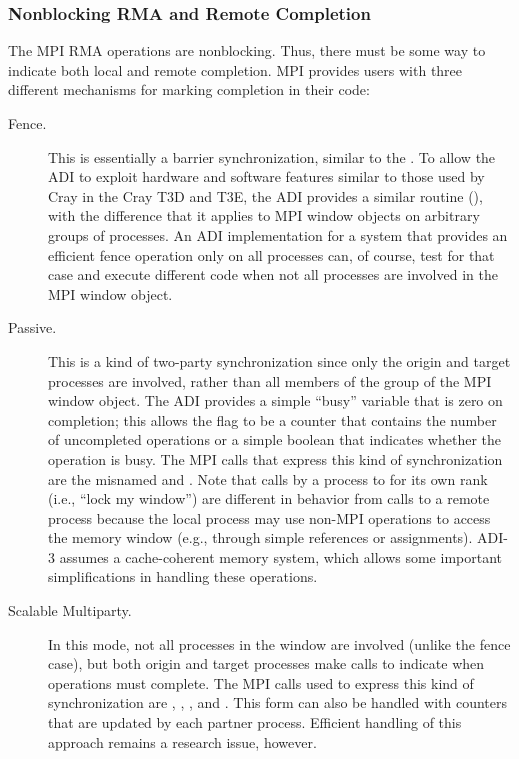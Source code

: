 \subsubsection{Nonblocking RMA and Remote Completion}
The MPI RMA operations are nonblocking.  Thus, there must be some way
to indicate both local and remote completion.  MPI provides users
with three different mechanisms for marking completion in their code:
\begin{description}
\item[Fence.]This is essentially a barrier synchronization, similar to
the .  To allow the ADI to exploit hardware and
software features similar to those used by Cray  in the
Cray T3D and T3E, the ADI provides a similar routine
(), with the 
difference that it applies to MPI window objects on arbitrary groups
of processes. An ADI implementation for a system that
provides an efficient fence operation only on all processes can, of
course, test for that case and execute different code when not all
processes are involved in the MPI window object.

\item[Passive.]This is a kind of two-party synchronization since only
the origin and target processes are involved, rather than all members of the
group of the MPI window object.  The ADI provides a
simple ``busy'' variable that is zero on completion; this allows the
flag to be a counter that contains the number of uncompleted
operations or a simple boolean that indicates whether the operation is
busy.  The MPI calls that express this kind of synchronization are the
misnamed 
 and .  Note that calls by a
process to  for its own rank (i.e., ``lock my
window'') are different in behavior from calls to a remote process
because the local process may use non-MPI operations to access the
memory window (e.g., through simple references or assignments).  ADI-3
assumes a cache-coherent memory system, which allows some important
simplifications in handling these operations.

\item[Scalable Multiparty.]In this mode, not all processes in the
window are involved (unlike the fence case), but both origin and
target processes make calls to indicate when operations must complete.
The MPI calls used to express this kind of synchronization are
, , ,
and .
This form can also be handled with counters that are updated by each
partner process.  Efficient handling of this approach remains a
research issue, however.
\end{description}


